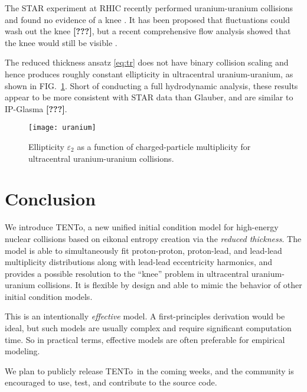 \documentclass[aps,prl,reprint,amsmath,nofootinbib]{revtex4-1}
\newcommand{\trento}{T\raisebox{-.5ex}{R}ENTo}
\newcommand{\needcite}{\textbf{[???]}}
\begin{document}
The STAR experiment at RHIC recently performed uranium-uranium collisions and found no evidence of a knee
\cite{UU-STAR}.  It has been proposed that fluctuations could wash out the knee \needcite, but a recent
comprehensive flow analysis showed that the knee would still be visible \cite{osu}.

The reduced thickness ansatz \eqref{eq:tr} does not have binary collision scaling and hence produces roughly
constant ellipticity in ultracentral uranium-uranium, as shown in FIG.~\ref{fig:uranium}.  Short of conducting
a full hydrodynamic analysis, these results appear to be more consistent with STAR data than Glauber, and are
similar to IP-Glasma \needcite.

\begin{figure}[t]
  \centering
  \texttt{[image: uranium]}
  \caption{
    \label{fig:uranium}
    Ellipticity $\varepsilon_2$ as a function of charged-particle multiplicity for ultracentral
    uranium-uranium collisions.
  }
\end{figure}


\section{Conclusion}

We introduce \trento, a new unified initial condition model for high-energy nuclear collisions based on
eikonal entropy creation via the \emph{reduced thickness}.  The model is able to simultaneously fit
proton-proton, proton-lead, and lead-lead multiplicity distributions along with lead-lead eccentricity harmonics,
and provides a possible resolution to the ``knee'' problem in ultracentral uranium-uranium collisions.
It is flexible by design and able to mimic the behavior of other initial condition models.

This is an intentionally \emph{effective} model.  A first-principles derivation would be ideal, but such
models are usually complex and require significant computation time.  So in practical terms, effective models
are often preferable for empirical modeling.

We plan to publicly release \trento\ in the coming weeks, and the community is encouraged to use, test, and
contribute to the source code.




\end{document}
